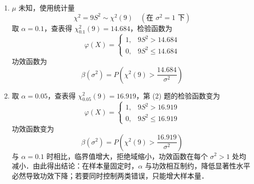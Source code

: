 \begin{solution}
\begin{enumerate}
    \item[(2)] $\mu$ 未知，使用统计量
    \[
    \chi^2 = 9S^2 \sim \chi^2(9) \quad (\text{在 } \sigma^2 = 1 \text{ 下})
    \]
    取 $\alpha = 0.1$，查表得 $\chi^2_{0.1}(9) = 14.684$，检验函数为
    \[
    \varphi(X) =
    \begin{cases}
    1, & 9S^2 > 14.684 \\
    0, & 9S^2 \leqslant 14.684
    \end{cases}
    \]
    功效函数为
    \[
    \beta(\sigma^2) = P\!\left(\chi^2(9) > \frac{14.684}{\sigma^2}\right)
    \]

    \item[(3)] 取 $\alpha = 0.05$，查表得 $\chi^2_{0.05}(9) = 16.919$，第 (2) 题的检验函数变为
    \[
    \varphi(X) =
    \begin{cases}
    1, & 9S^2 > 16.919 \\
    0, & 9S^2 \leqslant 16.919
    \end{cases}
    \]
    功效函数变为
    \[
    \beta(\sigma^2) = P\!\left(\chi^2(9) > \frac{16.919}{\sigma^2}\right)
    \]
    与 $\alpha = 0.1$ 时相比，临界值增大，拒绝域缩小，功效函数在每个 $\sigma^2 > 1$ 处均减小．由此得出结论：在样本量固定时，$\alpha$ 与功效相互制约，降低显著性水平必然导致功效下降；若要同时控制两类错误，只能增大样本量．
\end{enumerate}
\end{solution}

